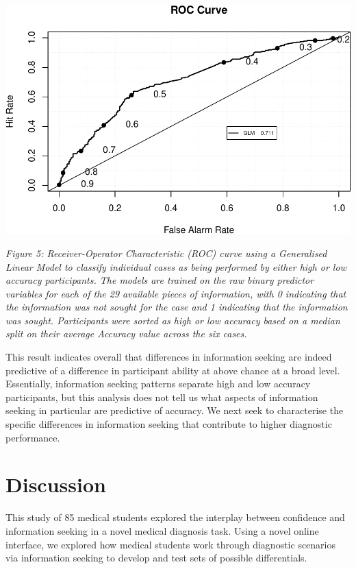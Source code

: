 \documentclass[a4paper, nobind]{templates/ociamthesis}
\begin{document}
\begin{center}\includegraphics[width=1\linewidth]{_main_files/figure-latex/accuracyClassifier-1} \end{center}

\emph{Figure 5: Receiver-Operator Characteristic (ROC) curve using a Generalised Linear Model to classify individual cases as being performed by either high or low accuracy participants. The models are trained on the raw binary predictor variables for each of the 29 available pieces of information, with 0 indicating that the information was not sought for the case and 1 indicating that the information was sought. Participants were sorted as high or low accuracy based on a median split on their average Accuracy value across the six cases.}

This result indicates overall that differences in information seeking are indeed predictive of a difference in participant ability at above chance at a broad level. Essentially, information seeking patterns separate high and low accuracy participants, but this analysis does not tell us what aspects of information seeking in particular are predictive of accuracy. We next seek to characterise the specific differences in information seeking that contribute to higher diagnostic performance.

\section*{Discussion}\label{discussion}

This study of 85 medical students explored the interplay between confidence and information seeking in a novel medical diagnosis task. Using a novel online interface, we explored how medical students work through diagnostic scenarios via information seeking to develop and test sets of possible differentials.
\end{document}
